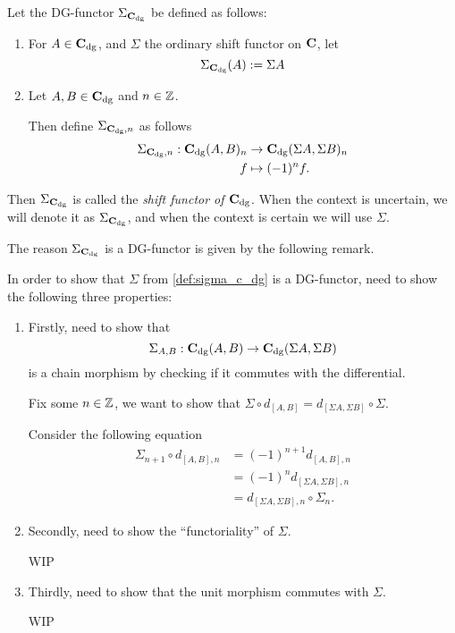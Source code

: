 \begin{definition}[Shift in \( \C_{\dg} \)]
    \label{def:sigma_c_dg}
    Let the DG-functor \( \Sigma_{\operatorname{\mathbf{C}}_{\operatorname{dg}}} \) be defined as follows:
    \begin{enumerate}
        \item {
            For \( A \in \operatorname{\mathbf{C}}_{\operatorname{dg}} \), and \( \Sigma \) the ordinary shift functor on \( \operatorname{\mathbf{C}} \), let
            \[
                \Sigma_{\operatorname{\mathbf{C}}_{\operatorname{dg}}}(A) := \Sigma A
            \]
        }
        \item {
            Let \( A, B \in \operatorname{\mathbf{C}}_{\operatorname{dg}} \) and \( n \in {\mathbb{Z}} \).

            Then define \( \Sigma_{\operatorname{\mathbf{C}}_{\operatorname{dg}}, n} \) as follows
            \begin{align*}
                \Sigma_{\operatorname{\mathbf{C}}_{\operatorname{dg}}, n}: \operatorname{\mathbf{C}}_{\operatorname{dg}}(A, B)_n &\to \operatorname{\mathbf{C}}_{\operatorname{dg}}(\Sigma A, \Sigma B)_n \\
                f &\mapsto (-1)^n f.
            \end{align*}
        }
    \end{enumerate}
    Then \( \Sigma_{\operatorname{\mathbf{C}}_{\operatorname{dg}}} \) is called the \emph{shift functor of \( \C_{\dg} \)}. When the context is uncertain, we will denote it as \( \Sigma_{\operatorname{\mathbf{C}}_{\operatorname{dg}}} \), and when the context is certain we will use \( \Sigma \).
\end{definition}

The reason \( \Sigma_{\operatorname{\mathbf{C}}_{\operatorname{dg}}} \) is a DG-functor is given by the following remark. 

\begin{remark}
    In order to show that \( \Sigma \) from \autoref{def:sigma_c_dg} is a DG-functor, need to show the following three properties:
    \begin{enumerate}
        \item {
            Firstly, need to show that
            \[
                \Sigma_{A, B}: \operatorname{\mathbf{C}}_{\operatorname{dg}}(A, B) \to \operatorname{\mathbf{C}}_{\operatorname{dg}}(\Sigma A, \Sigma B)
            \]
            is a chain morphism by checking if it commutes with the differential.

            Fix some \( n \in {\mathbb{Z}} \), we want to show that \( \Sigma \circ d_{[A, B]} = d_{[\Sigma A, \Sigma B]} \circ \Sigma \).

            Consider the following equation
            \begin{align*}
                \Sigma_{n + 1} \circ d_{[A, B], n} &= (-1)^{n + 1} d_{[A, B], n} \\
                &= (-1)^n d_{[\Sigma A, \Sigma B], n} \\
                &= d_{[\Sigma A, \Sigma B], n} \circ \Sigma_n.
            \end{align*}
        }
        \item {
            Secondly, need to show the ``functoriality'' of \( \Sigma \).

            WIP
        }
        \item {
            Thirdly, need to show that the unit morphism commutes with \( \Sigma \).

            WIP
        }
    \end{enumerate}
\end{remark}

